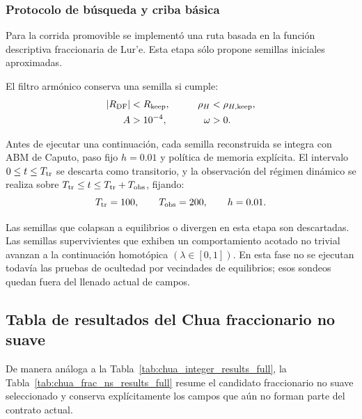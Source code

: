 \documentclass[journal]{IEEEtran}
\begin{document}
\subsubsection{Protocolo de búsqueda y criba básica}

Para la corrida promovible se implementó una ruta basada en la función
descriptiva fraccionaria de Lur'e. Esta etapa sólo propone semillas iniciales
aproximadas.

El filtro armónico conserva una semilla si cumple:
\begin{equation}
\begin{aligned}
 |R_{\rm DF}|&<R_{\rm keep},&\qquad
 \rho_H&<\rho_{H,\rm keep},\\
 A&>10^{-4},&
 \omega&>0.
 \end{aligned}
\end{equation}

Antes de ejecutar una continuación, cada semilla reconstruida se integra con
ABM de Caputo, paso fijo \(h=0.01\) y política de memoria explícita. El
intervalo \(0\leq t\leq T_{\rm tr}\) se descarta como transitorio, y la
observación del régimen dinámico se realiza sobre
\(T_{\rm tr}\leq t\leq T_{\rm tr}+T_{\rm obs}\), fijando:
\[
T_{\rm tr}=100,\qquad T_{\rm obs}=200,\qquad h=0.01.
\]

Las semillas que colapsan a equilibrios o divergen en esta etapa son
descartadas. Las semillas supervivientes que exhiben un comportamiento
acotado no trivial avanzan a la continuación homotópica
\((\lambda \in [0,1])\). En esta fase no se ejecutan todavía las pruebas de
ocultedad por vecindades de equilibrios; esos sondeos quedan fuera del llenado
actual de campos.

\subsection{Tabla de resultados del Chua fraccionario no suave}

De manera análoga a la Tabla~\ref{tab:chua_integer_results_full}, la
Tabla~\ref{tab:chua_frac_ns_results_full} resume el candidato fraccionario no
suave seleccionado y conserva explícitamente los campos que aún no forman parte
del contrato actual.
\end{document}
